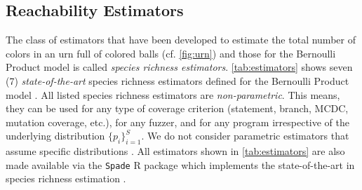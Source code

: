 \documentclass[conference]{IEEEtran}
\begin{document}
%

%
%

\subsection{Reachability Estimators}

The class of estimators that have been developed to estimate the total number of colors in an urn full of colored balls (cf. \autoref{fig:urn}) and those for the Bernoulli Product model is called \emph{species richness estimators}.
%
\autoref{tab:estimators} shows seven (7) \emph{state-of-the-art} \cite{survey1,survey2,survey3} species richness estimators defined for the Bernoulli Product model \cite{boehme2018stads}.
All listed species richness estimators are \emph{non-parametric}. This means, they can be used for any type of coverage criterion (statement, branch, MCDC, mutation coverage, etc.), for any fuzzer, and for any program irrespective of the underlying distribution $\{p_i\}_{i=1}^S$. We do not consider parametric estimators that assume specific distributions \cite{dorazio2003}. All estimators shown in \autoref{tab:estimators} are also made available via the \texttt{Spade} R package which implements the state-of-the-art in species richness estimation \cite{spade}.
\end{document}
